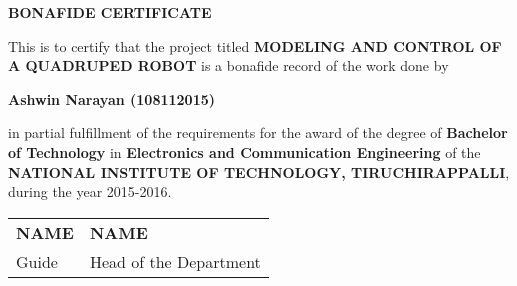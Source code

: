 \thispagestyle{plain}
\begin{center}
\textbf{BONAFIDE CERTIFICATE}
\end{center}

\vspace{0.3cm}
\fontsize{12pt}{24pt}\selectfont This is to certify that the project titled \textbf{MODELING AND CONTROL OF A QUADRUPED ROBOT} is a bonafide record of the work done by
\vspace{0.3cm}

\begin{center}
\textbf{Ashwin Narayan (108112015)}
\end{center}

\vspace{0.3cm}
\noindent
\fontsize{12pt}{24pt}\selectfont in partial fulfillment of the requirements for the award of the degree of \textbf{Bachelor of Technology} in \textbf{Electronics and Communication Engineering} of the \textbf{NATIONAL INSTITUTE OF TECHNOLOGY, TIRUCHIRAPPALLI}, during the year 2015-2016.

\vspace{3cm}

\begin{tabu} to \textwidth { X[l] X[c] }

 \textbf{NAME} & \textbf{NAME} \\
 Guide & Head of the Department

\end{tabu}
\newpage

